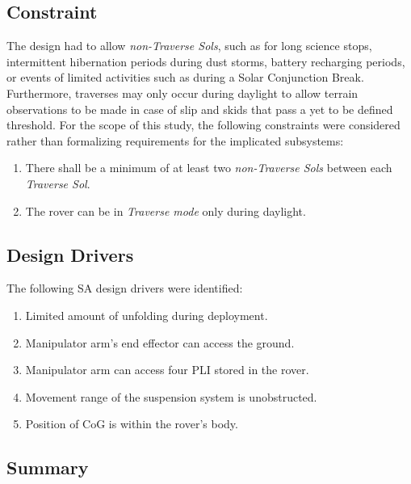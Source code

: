 \subsection{Constraint}
\label{sec:Design:RequirementsAndDesignDrivers:Constraints}
The design had to allow \textit{non-Traverse Sols}, such as for long science stops, intermittent hibernation periods during dust storms, battery recharging periods, or events of limited activities such as during a Solar Conjunction Break. Furthermore, traverses may only occur during daylight to allow terrain observations to be made in case of slip and skids that pass a yet to be defined threshold. For the scope of this study, the following constraints were considered rather than formalizing requirements for the implicated subsystems:

\begin{enumerate}[label=\textbf{\textcolor{BulletBlue}{C-\arabic*}}]
    \item There shall be a minimum of at least two \textit{non-Traverse Sols} between each \textit{Traverse Sol}.
    \item \label{itm:con:daylight_traverse} The rover can be in \textit{Traverse mode} only during daylight.
\end{enumerate}

\subsection{Design Drivers}
\label{sec:Design:RequirementsAndDesignDrivers:DesignDrivers}
The following \ac{SA} design drivers were identified:

\begin{enumerate}[label=\textbf{\textcolor{BulletBlue}{D-\arabic*}}]
    \item Limited amount of unfolding during deployment.
    \item Manipulator arm's end effector can access the ground.
    \item Manipulator arm can access four \ac{PLI} stored in the rover.
    \item Movement range of the suspension system is unobstructed.
    \item Position of \ac{CoG} is within the rover's body.
\end{enumerate}

\subsection{Summary}
\label{sec:Design:RequirementsAndDesignDrivers:Summary}
